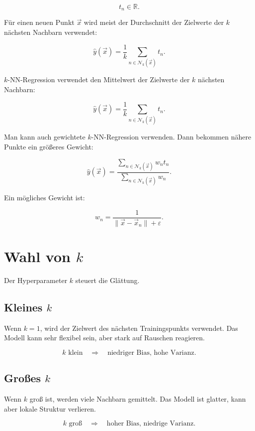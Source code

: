 \[
    t_n\in\mathbb{R}.
\]

Für einen neuen Punkt \(\vec{x}\) wird meist der Durchschnitt der Zielwerte der \(k\) nächsten Nachbarn verwendet:

\[
    \hat{y}(\vec{x})
    =
    \frac{1}{k}
    \sum_{n\in\mathcal{N}_k(\vec{x})}
    t_n.
\]

\begin{definitionbox}
\(k\)-NN-Regression verwendet den Mittelwert der Zielwerte der \(k\) nächsten Nachbarn:

\[
    \hat{y}(\vec{x})
    =
    \frac{1}{k}
    \sum_{n\in\mathcal{N}_k(\vec{x})}
    t_n.
\]
\end{definitionbox}

Man kann auch gewichtete \(k\)-NN-Regression verwenden.
Dann bekommen nähere Punkte ein größeres Gewicht:

\[
    \hat{y}(\vec{x})
    =
    \frac{
        \sum_{n\in\mathcal{N}_k(\vec{x})}
        w_n t_n
    }{
        \sum_{n\in\mathcal{N}_k(\vec{x})}
        w_n
    }.
\]

Ein mögliches Gewicht ist:

\[
    w_n
    =
    \frac{1}{\|\vec{x}-\vec{x}_n\|+\varepsilon}.
\]

\section{Wahl von \(k\)}

Der Hyperparameter \(k\) steuert die Glättung.

\subsection{Kleines \(k\)}

Wenn \(k=1\), wird der Zielwert des nächsten Trainingspunkts verwendet.
Das Modell kann sehr flexibel sein, aber stark auf Rauschen reagieren.

\[
    k \text{ klein}
    \quad
    \Rightarrow
    \quad
    \text{niedriger Bias, hohe Varianz}.
\]

\subsection{Großes \(k\)}

Wenn \(k\) groß ist, werden viele Nachbarn gemittelt.
Das Modell ist glatter, kann aber lokale Struktur verlieren.

\[
    k \text{ groß}
    \quad
    \Rightarrow
    \quad
    \text{hoher Bias, niedrige Varianz}.
\]

